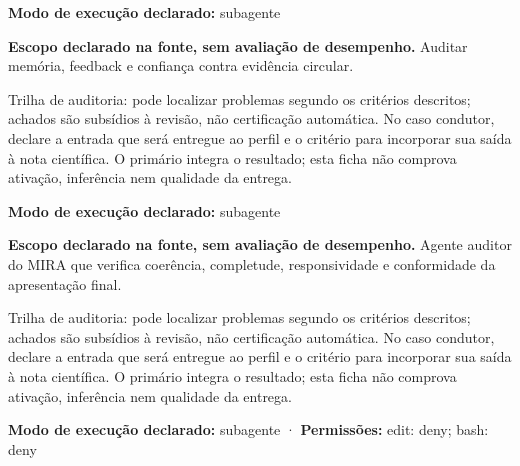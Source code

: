 \begin{arquitetura}
\textbf{Modo de execução declarado:} subagente
\end{arquitetura}


\begin{descricao}
\textbf{Escopo declarado na fonte, sem avaliação de desempenho.}
Auditar memória, feedback e confiança contra evidência circular.
\end{descricao}

\begin{funcao}
Trilha de auditoria: pode localizar problemas segundo os critérios descritos; achados são subsídios à revisão, não certificação automática. No caso condutor, declare a entrada que será entregue ao perfil e o critério para incorporar sua saída à nota científica. O primário integra o resultado; esta ficha não comprova ativação, inferência nem qualidade da entrega.
\end{funcao}

\begin{arquitetura}
\textbf{Modo de execução declarado:} subagente
\end{arquitetura}


\begin{descricao}
\textbf{Escopo declarado na fonte, sem avaliação de desempenho.}
Agente auditor do MIRA que verifica coerência, completude, responsividade e conformidade da apresentação final.
\end{descricao}

\begin{funcao}
Trilha de auditoria: pode localizar problemas segundo os critérios descritos; achados são subsídios à revisão, não certificação automática. No caso condutor, declare a entrada que será entregue ao perfil e o critério para incorporar sua saída à nota científica. O primário integra o resultado; esta ficha não comprova ativação, inferência nem qualidade da entrega.
\end{funcao}

\begin{arquitetura}
\textbf{Modo de execução declarado:} subagente · \textbf{Permissões:} edit: deny; bash: deny
\end{arquitetura}

